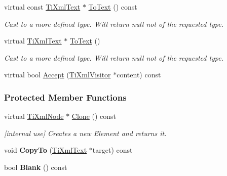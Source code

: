 \begin{DoxyCompactItemize}
\item 
\hypertarget{class_ti_xml_text_a895bf34ffad17f7439ab2a52b9651648}{
virtual const \hyperlink{class_ti_xml_text}{TiXmlText} $\ast$ \hyperlink{class_ti_xml_text_a895bf34ffad17f7439ab2a52b9651648}{ToText} () const }
\label{class_ti_xml_text_a895bf34ffad17f7439ab2a52b9651648}

\begin{DoxyCompactList}\small\item\em Cast to a more defined type. Will return null not of the requested type. \item\end{DoxyCompactList}\item 
\hypertarget{class_ti_xml_text_ae7c3a8fd3e4dbf6c0c4363a943d72f5b}{
virtual \hyperlink{class_ti_xml_text}{TiXmlText} $\ast$ \hyperlink{class_ti_xml_text_ae7c3a8fd3e4dbf6c0c4363a943d72f5b}{ToText} ()}
\label{class_ti_xml_text_ae7c3a8fd3e4dbf6c0c4363a943d72f5b}

\begin{DoxyCompactList}\small\item\em Cast to a more defined type. Will return null not of the requested type. \item\end{DoxyCompactList}\item 
virtual bool \hyperlink{class_ti_xml_text_a43b9954ebf679557fac1a4453f337b7c}{Accept} (\hyperlink{class_ti_xml_visitor}{TiXmlVisitor} $\ast$content) const 
\end{DoxyCompactItemize}
\subsubsection*{Protected Member Functions}
\begin{DoxyCompactItemize}
\item 
\hypertarget{class_ti_xml_text_adde1869dfb029be50713fbfd8ce4d21f}{
virtual \hyperlink{class_ti_xml_node}{TiXmlNode} $\ast$ \hyperlink{class_ti_xml_text_adde1869dfb029be50713fbfd8ce4d21f}{Clone} () const }
\label{class_ti_xml_text_adde1869dfb029be50713fbfd8ce4d21f}

\begin{DoxyCompactList}\small\item\em \mbox{[}internal use\mbox{]} Creates a new Element and returns it. \item\end{DoxyCompactList}\item 
\hypertarget{class_ti_xml_text_adcec7d9b6fccfc5777452bb97e6031c1}{
void {\bfseries CopyTo} (\hyperlink{class_ti_xml_text}{TiXmlText} $\ast$target) const }
\label{class_ti_xml_text_adcec7d9b6fccfc5777452bb97e6031c1}

\item 
\hypertarget{class_ti_xml_text_a1c120428e3b3cf24d79706e6d2b65aa6}{
bool {\bfseries Blank} () const }
\label{class_ti_xml_text_a1c120428e3b3cf24d79706e6d2b65aa6}

\end{DoxyCompactItemize}
